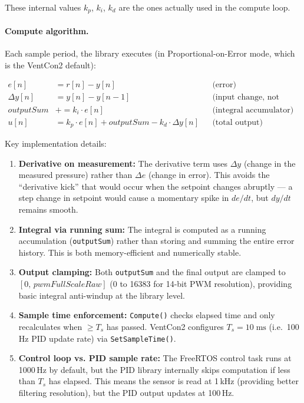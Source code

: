 These internal values $k_p$, $k_i$, $k_d$ are the ones actually used in the compute loop.

\paragraph{Compute algorithm.}
Each sample period, the library executes (in Proportional-on-Error mode, which is the VentCon2 default):

\begin{align}
    e[n]          &= r[n] - y[n]                         & &\text{(error)} \\
    \Delta y[n]   &= y[n] - y[n{-}1]                     & &\text{(input change, not error change)} \\
    \mathit{outputSum} &\mathrel{+}= k_i \cdot e[n]      & &\text{(integral accumulator)} \\
    u[n]          &= k_p \cdot e[n] + \mathit{outputSum} - k_d \cdot \Delta y[n]
                                                          & &\text{(total output)}
\end{align}

\noindent
Key implementation details:

\begin{enumerate}
    \item \textbf{Derivative on measurement:} The derivative term uses $\Delta y$ (change in the measured pressure) rather than $\Delta e$ (change in error). This avoids the ``derivative kick'' that would occur when the setpoint changes abruptly --- a step change in setpoint would cause a momentary spike in $de/dt$, but $dy/dt$ remains smooth.
    
    \item \textbf{Integral via running sum:} The integral is computed as a running accumulation (\texttt{outputSum}) rather than storing and summing the entire error history. This is both memory-efficient and numerically stable.
    
    \item \textbf{Output clamping:} Both \texttt{outputSum} and the final output are clamped to $[0,\, \mathit{pwmFullScaleRaw}]$ (0 to 16383 for 14-bit PWM resolution), providing basic integral anti-windup at the library level.
    
    \item \textbf{Sample time enforcement:} \texttt{Compute()} checks elapsed time and only recalculates when $\geq T_s$ has passed. VentCon2 configures $T_s = 10\;\text{ms}$ (i.e.\ 100\,Hz PID update rate) via \texttt{SetSampleTime()}.
    
    \item \textbf{Control loop vs. PID sample rate:} The FreeRTOS control task runs at 1000\,Hz by default, but the PID library internally skips computation if less than $T_s$ has elapsed. This means the sensor is read at 1\,kHz (providing better filtering resolution), but the PID output updates at 100\,Hz.
\end{enumerate}

